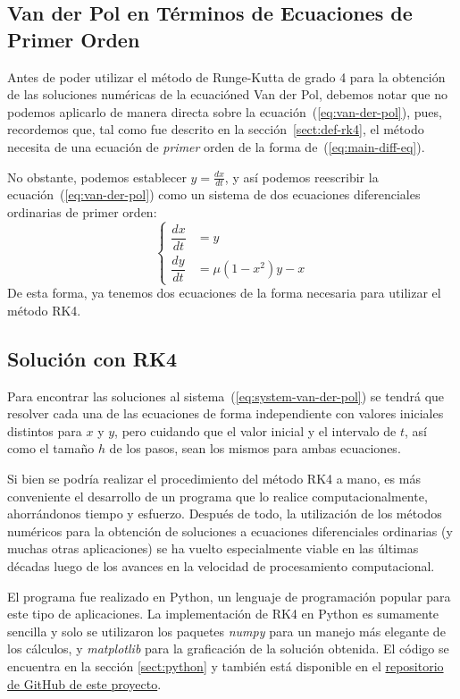 \documentclass[12pt, a4paper]{article}
\begin{document}
\subsection{Van der Pol en Términos de Ecuaciones de Primer Orden}

Antes de poder utilizar el método de Runge-Kutta de grado 4 para la obtención de las soluciones numéricas de la ecuacióned Van der Pol, debemos notar que no podemos aplicarlo de manera directa sobre la ecuación~(\ref{eq:van-der-pol}), pues, recordemos que, tal como fue descrito en la sección~\ref{sect:def-rk4}, el método necesita de una ecuación de \textit{primer} orden de la forma de~(\ref{eq:main-diff-eq}).

No obstante, podemos establecer \(y = \frac{dx}{dt}\), y así podemos reescribir la ecuación~(\ref{eq:van-der-pol}) como un sistema de dos ecuaciones diferenciales ordinarias de primer orden:
\begin{equation} \label{eq:system-van-der-pol}
	\begin{cases}
		\dfrac{dx}{dt} &= y \\[1em]
		\dfrac{dy}{dt} &= \mu(1 - x^{2})y - x
	\end{cases}
\end{equation}
De esta forma, ya tenemos dos ecuaciones de la forma necesaria para utilizar el método RK4.

\subsection{Solución con RK4}

Para encontrar las soluciones al sistema~(\ref{eq:system-van-der-pol}) se tendrá que resolver cada una de las ecuaciones de forma independiente con valores iniciales distintos para \(x\) y \(y\), pero cuidando que el valor inicial y el intervalo de \(t\), así como el tamaño \(h\) de los pasos, sean los mismos para ambas ecuaciones.

Si bien se podría realizar el procedimiento del método RK4 a mano, es más conveniente el desarrollo de un programa que lo realice computacionalmente, ahorrándonos tiempo y esfuerzo. Después de todo, la utilización de los métodos numéricos para la obtención de soluciones a ecuaciones diferenciales ordinarias (y muchas otras aplicaciones) se ha vuelto especialmente viable en las últimas décadas luego de los avances en la velocidad de procesamiento computacional.

El programa fue realizado en Python, un lenguaje de programación popular para este tipo de aplicaciones. La implementación de RK4 en Python es sumamente sencilla y solo se utilizaron los paquetes \textit{numpy} para un manejo más elegante de los cálculos, y \textit{matplotlib} para la graficación de la solución obtenida. El código se encuentra en la sección \ref{sect:python} y también está disponible en el \href{https://github.com/camargomau/runge-kutta}{repositorio de GitHub de este proyecto}.
\end{document}
